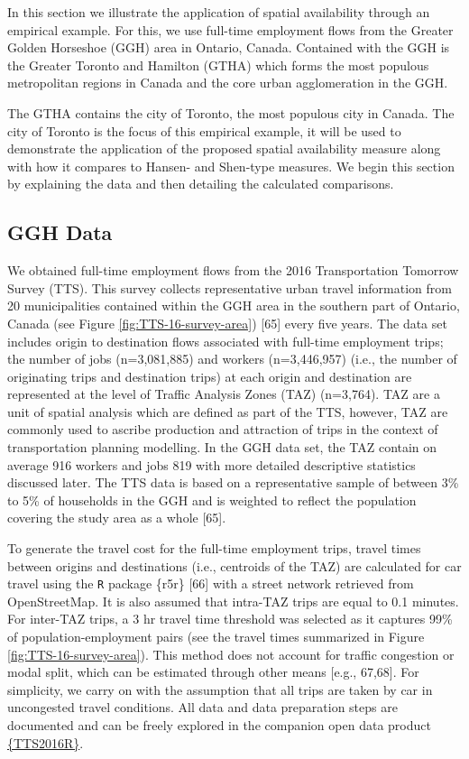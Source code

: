 \documentclass[10pt,letterpaper]{article}
\begin{document}
In this section we illustrate the application of spatial availability
through an empirical example. For this, we use full-time employment
flows from the Greater Golden Horseshoe (GGH) area in Ontario, Canada.
Contained with the GGH is the Greater Toronto and Hamilton (GTHA) which
forms the most populous metropolitan regions in Canada and the core
urban agglomeration in the GGH.

The GTHA contains the city of Toronto, the most populous city in Canada.
The city of Toronto is the focus of this empirical example, it will be
used to demonstrate the application of the proposed spatial availability
measure along with how it compares to Hansen- and Shen-type measures. We
begin this section by explaining the data and then detailing the
calculated comparisons.

\hypertarget{ggh-data}{%
\subsection{GGH Data}\label{ggh-data}}

We obtained full-time employment flows from the 2016 Transportation
Tomorrow Survey (TTS). This survey collects representative urban travel
information from 20 municipalities contained within the GGH area in the
southern part of Ontario, Canada (see Figure
\ref{fig:TTS-16-survey-area}) {[}65{]} every five years. The data set
includes origin to destination flows associated with full-time
employment trips; the number of jobs (n=3,081,885) and workers
(n=3,446,957) (i.e., the number of originating trips and destination
trips) at each origin and destination are represented at the level of
Traffic Analysis Zones (TAZ) (n=3,764). TAZ are a unit of spatial
analysis which are defined as part of the TTS, however, TAZ are commonly
used to ascribe production and attraction of trips in the context of
transportation planning modelling. In the GGH data set, the TAZ contain
on average 916 workers and jobs 819 with more detailed descriptive
statistics discussed later. The TTS data is based on a representative
sample of between 3\% to 5\% of households in the GGH and is weighted to
reflect the population covering the study area as a whole {[}65{]}.

To generate the travel cost for the full-time employment trips, travel
times between origins and destinations (i.e., centroids of the TAZ) are
calculated for car travel using the \texttt{R} package \{r5r\} {[}66{]}
with a street network retrieved from OpenStreetMap. It is also assumed
that intra-TAZ trips are equal to 0.1 minutes. For inter-TAZ trips, a 3
hr travel time threshold was selected as it captures 99\% of
population-employment pairs (see the travel times summarized in Figure
\ref{fig:TTS-16-survey-area}). This method does not account for traffic
congestion or modal split, which can be estimated through other means
{[}e.g., 67,68{]}. For simplicity, we carry on with the assumption that
all trips are taken by car in uncongested travel conditions. All data
and data preparation steps are documented and can be freely explored in
the companion open data product
\href{https://soukhova.github.io/TTS2016R/}{\{TTS2016R\}}.
\end{document}

